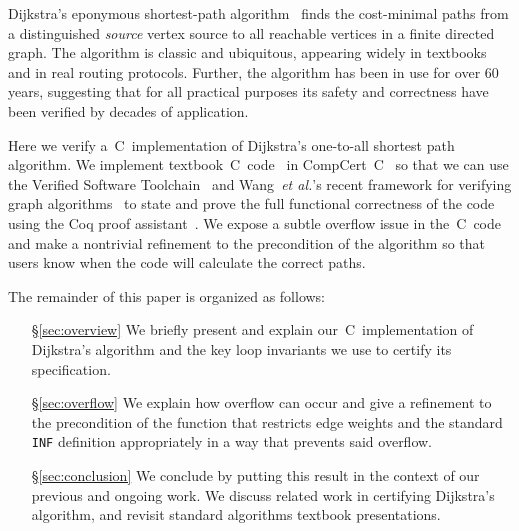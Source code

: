 Dijkstra's eponymous shortest-path algorithm~\cite{DBLP:journals/nm/Dijkstra59} finds
the cost-minimal paths from a distinguished \emph{source} vertex
source to all reachable vertices in a finite directed graph.
The algorithm is classic and ubiquitous, appearing widely in textbooks~\cite{clrs}
and in real routing protocols. Further, the algorithm has been in
use for over $60$ years, suggesting that for all practical purposes
its safety and correctness have been verified by decades of application.


Here we verify a~C~implementation of Dijkstra's one-to-all shortest path algorithm.
We implement textbook~C~code~\cite{clrs} in CompCert~C~\cite{leroy:compcert} so that
we can use the Verified Software Toolchain~\cite{appel:programlogics} and
Wang~\emph{et al.}'s recent framework for verifying graph algorithms~\cite{DBLP:journals/pacmpl/WangCMH19} to state and prove the full functional
correctness of the code using the Coq proof assistant~\cite{coq}.
We expose a subtle overflow issue in the~C~code and make a nontrivial refinement to the precondition of the algorithm so that users know when the code will calculate the correct paths.

The remainder of this paper is organized as follows:
\begin{itemize}
    \item[\S\ref{sec:overview}] We briefly present and explain
    our~C~implementation of Dijkstra's algorithm and the key loop invariants
    we use to certify its specification.
    \item[\S\ref{sec:overflow}] We explain how overflow can occur and give a
    refinement to the precondition of the function that restricts edge weights
    and the standard \texttt{INF} definition
    appropriately in a way that prevents said overflow.
    \item[\S\ref{sec:conclusion}] We conclude by putting this result in the context of our
    previous and ongoing work. We discuss related work in certifying Dijkstra's algorithm, and revisit standard algorithms textbook presentations.
\end{itemize} 

